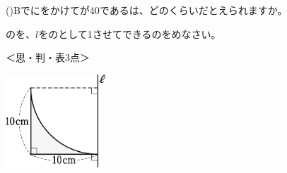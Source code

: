 \documentclass[
  12pt,a4paper,lualatex,ja=standard]{bxjsarticle}
\begin{document}
\begin{flushleft}
()\hspace{2.5pt}Bでにをかけてが40であるは、どのくらいだとえられますか。

\vspace{50mm}

\begin{multicols*}{2}

\noindent{} \hspace{1pt}のを、$l$をのとして1させてできるのをめなさい。

%
\begin{flushright}%
\footnotesize{＜思・判・表3点＞}%
\end{flushright}%


\vfill\null

\columnbreak

\begin{center}
\def\@captype{figure}
\includegraphics[height=35mm]{img/img15.jpg}

\end{center}

\end{multicols*}


\end{flushleft}
\end{document}
